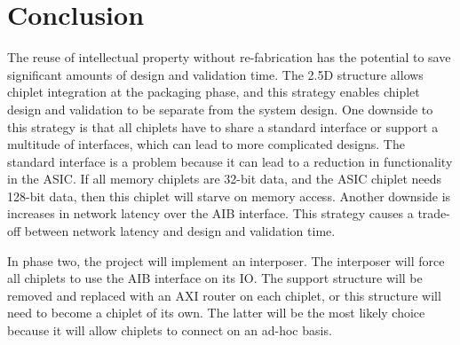 \documentclass[../main.tex]{subfiles}
\begin{document}
\section{Conclusion}


The reuse of intellectual property without re-fabrication has the potential to save significant amounts of design and validation time. The 2.5D structure allows chiplet integration at the packaging phase, and this strategy enables chiplet design and validation to be separate from the system design. One downside to this strategy is that all chiplets have to share a standard interface or support a multitude of interfaces, which can lead to more complicated designs. The standard interface is a problem because it can lead to a reduction in functionality in the ASIC. If all memory chiplets are 32-bit data, and the ASIC chiplet needs 128-bit data, then this chiplet will starve on memory access.  Another downside is increases in network latency over the AIB interface. This strategy causes a trade-off between network latency and design and validation time. 

In phase two, the project will implement an interposer. The interposer will force all chiplets to use the AIB interface on its IO. The support structure will be removed and replaced with an AXI router on each chiplet, or this structure will need to become a chiplet of its own. The latter will be the most likely choice because it will allow chiplets to connect on an ad-hoc basis.
\end{document}
